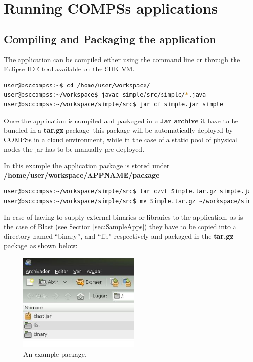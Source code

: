\section{Running COMPSs applications}
\label{sec:RunningApps}

\subsection{Compiling and Packaging the application}
\label{subsec:compiling_and_packaging_apps}

The application can be compiled either using the command line or through the Eclipse IDE tool available on the SDK VM.

\begin{lstlisting}[language=bash]
user@bsccompss:~$ cd /home/user/workspace/
user@bsccompss:~/workspace$ javac simple/src/simple/*.java
user@bsccompss:~/workspace/simple/src$ jar cf simple.jar simple 
\end{lstlisting}


Once the application is compiled and packaged in a {\bf Jar archive} it have to be bundled in a {\bf tar.gz} package; 
this package will be automatically deployed by COMPSs in a cloud environment, while in the case of a static pool of 
physical nodes the jar has to be manually pre-deployed.

In this example the application package is stored under {\bf /home/user/workspace/APPNAME/package}

\begin{lstlisting}[language=bash]
user@bsccompss:~/workspace/simple/src$ tar czvf Simple.tar.gz simple.jar
user@bsccompss:~/workspace/simple/src$ mv Simple.tar.gz ~/workspace/simple/package/
\end{lstlisting}

In case of having to supply external binaries or libraries to the application, as is the case of Blast 
(see Section \ref{sec:SampleApps}) they have to be copied into a directory named ``binary'', and ``lib''
respectively and packaged in the {\bf tar.gz} package as shown below:

\begin{figure}[h!]
  \centering
    \includegraphics[width=60mm]{./Sections/3_Running_Apps/Figures/example_package.jpeg}
    \caption{An example package. \label{fig:example_package}}
\end{figure}



